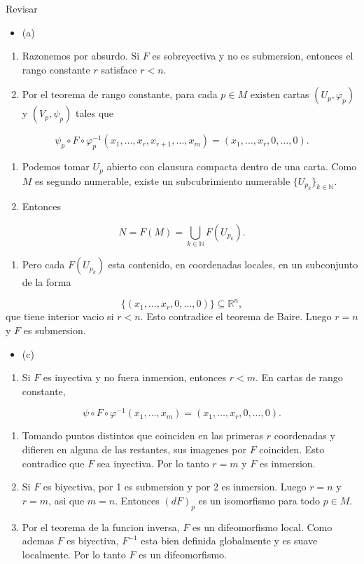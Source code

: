 \begin{bookproof}{Revisar}
\begin{itemize}
\item (a)
\end{itemize}
\begin{enumerate}
\item Razonemos por absurdo. Si $F$ es sobreyectiva y no es submersion, entonces el rango constante $r$ satisface $r<n$.
\item Por el teorema de rango constante, para cada $p\in M$ existen cartas $(U_p,\varphi_p)$ y $(V_p,\psi_p)$ tales que
\end{enumerate}
\[
\psi_p\circ F\circ\varphi_p^{-1}(x_1,\ldots,x_r,x_{r+1},\ldots,x_m)=(x_1,\ldots,x_r,0,\ldots,0).
\]
\begin{enumerate}[start=3]
\item Podemos tomar $U_p$ abierto con clausura compacta dentro de una carta. Como $M$ es segundo numerable, existe un subcubrimiento numerable $\{U_{p_k}\}_{k\in\mathbb N}$.
\item Entonces
\end{enumerate}
\[
N=F(M)=\bigcup_{k\in\mathbb N}F(U_{p_k}).
\]
\begin{enumerate}[start=5]
\item Pero cada $F(U_{p_k})$ esta contenido, en coordenadas locales, en un subconjunto de la forma
\end{enumerate}
\[
\{(x_1,\ldots,x_r,0,\ldots,0)\}\subseteq\mathbb R^n,
\]
que tiene interior vacio si $r<n$. Esto contradice el teorema de Baire. Luego $r=n$ y $F$ es submersion.

\begin{itemize}
\item (c)
\end{itemize}
\begin{enumerate}
\item Si $F$ es inyectiva y no fuera inmersion, entonces $r<m$. En cartas de rango constante,
\end{enumerate}
\[
\psi\circ F\circ\varphi^{-1}(x_1,\ldots,x_m)=(x_1,\ldots,x_r,0,\ldots,0).
\]
\begin{enumerate}[start=2]
\item Tomando puntos distintos que coinciden en las primeras $r$ coordenadas y difieren en alguna de las restantes, sus imagenes por $F$ coinciden. Esto contradice que $F$ sea inyectiva. Por lo tanto $r=m$ y $F$ es inmersion.
\item Si $F$ es biyectiva, por 1 es submersion y por 2 es inmersion. Luego $r=n$ y $r=m$, asi que $m=n$. Entonces $(dF)_p$ es un isomorfismo para todo $p\in M$.
\item Por el teorema de la funcion inversa, $F$ es un difeomorfismo local. Como ademas $F$ es biyectiva, $F^{-1}$ esta bien definida globalmente y es suave localmente. Por lo tanto $F$ es un difeomorfismo.
\end{enumerate}
\bookqed
\end{bookproof}
